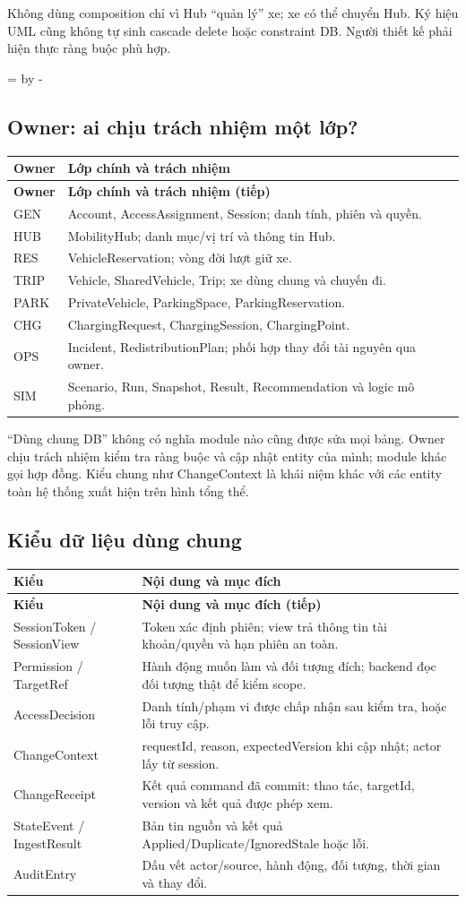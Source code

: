 \documentclass[12pt,a4paper]{article}
\newcommand{\Needspace}[1]{%
  \par\begingroup\dimen0=\pagegoal\advance\dimen0 by -\pagetotal
  \ifdim\dimen0<#1\relax\newpage\fi\endgroup}
\newenvironment{PairTable}[2]{%
  \begin{longtable}{|L{39mm}|L{106mm}|}\hline
  \textbf{#1} & \textbf{#2}\\\hline\endfirsthead
  \hline\textbf{#1} & \textbf{#2 (tiếp)}\\\hline\endhead
}{\end{longtable}}
\begin{document}
Không dùng composition chỉ vì Hub ``quản lý'' xe; xe có thể chuyển Hub. Ký hiệu UML cũng không tự sinh cascade delete hoặc constraint DB. Người thiết kế phải hiện thực ràng buộc phù hợp.

\Needspace{8\baselineskip}
\subsection{Owner: ai chịu trách nhiệm một lớp?}
\begin{PairTable}{Owner}{Lớp chính và trách nhiệm}
GEN & Account, AccessAssignment, Session; danh tính, phiên và quyền.\\\hline
HUB & MobilityHub; danh mục/vị trí và thông tin Hub.\\\hline
RES & VehicleReservation; vòng đời lượt giữ xe.\\\hline
TRIP & Vehicle, SharedVehicle, Trip; xe dùng chung và chuyến đi.\\\hline
PARK & PrivateVehicle, ParkingSpace, ParkingReservation.\\\hline
CHG & ChargingRequest, ChargingSession, ChargingPoint.\\\hline
OPS & Incident, RedistributionPlan; phối hợp thay đổi tài nguyên qua owner.\\\hline
SIM & Scenario, Run, Snapshot, Result, Recommendation và logic mô phỏng.\\\hline
\end{PairTable}

``Dùng chung DB'' không có nghĩa module nào cũng được sửa mọi bảng. Owner chịu trách nhiệm kiểm tra ràng buộc và cập nhật entity của mình; module khác gọi hợp đồng. Kiểu chung như ChangeContext là khái niệm khác với các entity toàn hệ thống xuất hiện trên hình tổng thể.

\subsection{Kiểu dữ liệu dùng chung}
\begin{PairTable}{Kiểu}{Nội dung và mục đích}
SessionToken / SessionView & Token xác định phiên; view trả thông tin tài khoản/quyền và hạn phiên an toàn.\\\hline
Permission / TargetRef & Hành động muốn làm và đối tượng đích; backend đọc đối tượng thật để kiểm scope.\\\hline
AccessDecision & Danh tính/phạm vi được chấp nhận sau kiểm tra, hoặc lỗi truy cập.\\\hline
ChangeContext & requestId, reason, expectedVersion khi cập nhật; actor lấy từ session.\\\hline
ChangeReceipt & Kết quả command đã commit: thao tác, targetId, version và kết quả được phép xem.\\\hline
StateEvent / IngestResult & Bản tin nguồn và kết quả Applied/Duplicate/IgnoredStale hoặc lỗi.\\\hline
AuditEntry & Dấu vết actor/source, hành động, đối tượng, thời gian và thay đổi.\\\hline
\end{PairTable}
\end{document}

